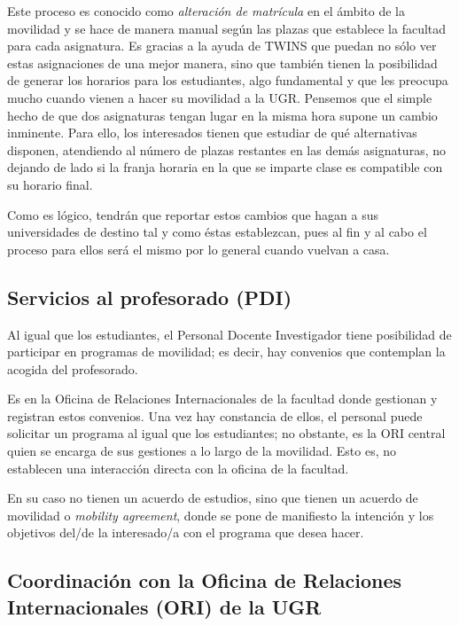 Este proceso es conocido como \textit{alteración de matrícula} en el ámbito de la movilidad y se hace de manera manual según las plazas que establece la facultad para cada asignatura. Es gracias a la ayuda de TWINS que puedan no sólo ver estas asignaciones de una mejor manera, sino que también tienen la posibilidad de generar los horarios para los estudiantes, algo fundamental y que les preocupa mucho cuando vienen a hacer su movilidad a la UGR. Pensemos que el simple hecho de que dos asignaturas tengan lugar en la misma hora supone un cambio inminente. Para ello, los interesados tienen que estudiar de qué alternativas disponen, atendiendo al número de plazas restantes en las demás asignaturas, no dejando de lado si la franja horaria en la que se imparte clase es compatible con su horario final.

Como es lógico, tendrán que reportar estos cambios que hagan a sus universidades de destino tal y como éstas establezcan, pues al fin y al cabo el proceso para ellos será el mismo por lo general cuando vuelvan a casa.


\subsection{Servicios al profesorado (PDI)}

Al igual que los estudiantes, el Personal Docente Investigador tiene posibilidad de participar en programas de movilidad; es decir, hay convenios que contemplan la acogida del profesorado.

Es en la Oficina de Relaciones Internacionales de la facultad donde gestionan y registran estos convenios. Una vez hay constancia de ellos, el personal puede solicitar un programa al igual que los estudiantes; no obstante, es la ORI central quien se encarga de sus gestiones a lo largo de la movilidad. Esto es, no establecen una interacción directa con la oficina de la facultad.

En su caso no tienen un acuerdo de estudios, sino que tienen un acuerdo de movilidad o \textit{mobility agreement}, donde se pone de manifiesto la intención y los objetivos del/de la interesado/a con el programa que desea hacer.



\subsection{Coordinación con la Oficina de Relaciones Internacionales (ORI) de la UGR}

